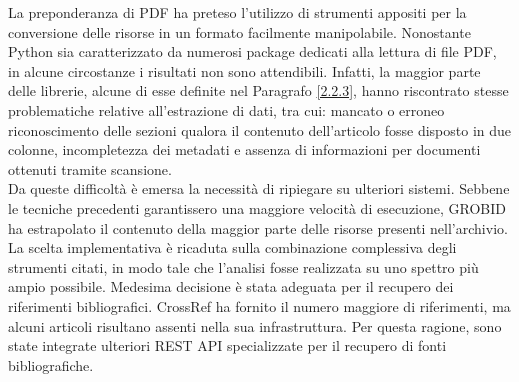 La preponderanza di PDF ha preteso l'utilizzo di strumenti appositi per la conversione delle risorse in un formato facilmente manipolabile. Nonostante Python sia caratterizzato da numerosi package dedicati alla lettura di file PDF, in alcune circostanze i risultati non sono attendibili. Infatti, la maggior parte delle librerie, alcune di esse definite nel Paragrafo \ref{2.2.3}, hanno riscontrato stesse problematiche relative all'estrazione di dati, tra cui: mancato o erroneo riconoscimento delle sezioni qualora il contenuto dell'articolo fosse disposto in due colonne, incompletezza dei metadati e assenza di informazioni per documenti ottenuti tramite scansione. \vspace{7pt} \\
Da queste difficoltà è emersa la necessità di ripiegare su ulteriori sistemi. Sebbene le tecniche precedenti garantissero una maggiore velocità di esecuzione, GROBID ha estrapolato il contenuto della maggior parte delle risorse presenti nell'archivio. \vspace{7pt} \\
La scelta implementativa è ricaduta sulla combinazione complessiva degli strumenti citati, in modo tale che l'analisi fosse realizzata su uno spettro più ampio possibile. Medesima decisione è stata adeguata per il recupero dei riferimenti bibliografici. CrossRef ha fornito il numero maggiore di riferimenti, ma alcuni articoli risultano assenti nella sua infrastruttura. Per questa ragione, sono state integrate ulteriori REST API specializzate per il recupero di fonti bibliografiche.